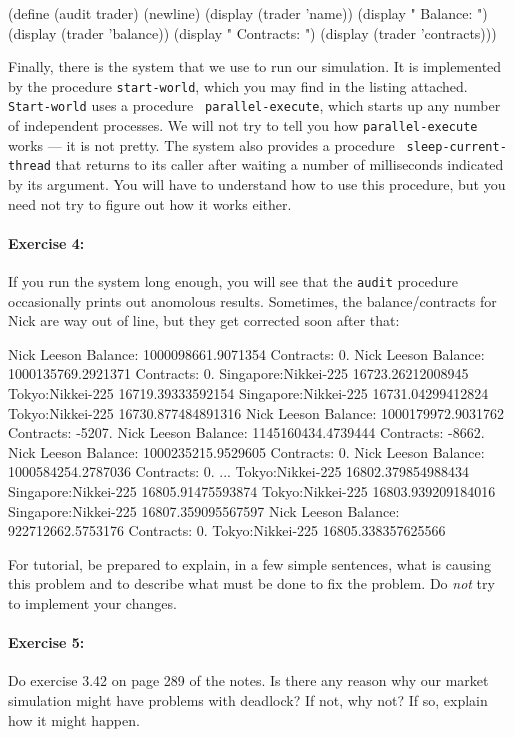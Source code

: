 \beginlisp
(define (audit trader)
  (newline)
  (display (trader 'name))
  (display "    Balance: ")
  (display (trader 'balance))
  (display "    Contracts: ")
  (display (trader 'contracts)))
\endlisp

Finally, there is the system that we use to run our simulation.
It is implemented by the procedure {\tt start-world}, which you may
find in the listing attached.  {\tt Start-world} uses a procedure {\tt
parallel-execute}, which starts up any number of independent
processes.  We will not try to tell you how {\tt parallel-execute}
works --- it is not pretty.  The system also provides a procedure {\tt
sleep-current-thread} that returns to its caller after waiting a
number of milliseconds indicated by its argument.  You will have to
understand how to use this procedure, but you need not try to figure
out how it works either.

\paragraph{Exercise 4:} If you run the system long enough, you will
see that the {\tt audit} procedure occasionally prints out anomolous
results.  Sometimes, the balance/contracts for Nick are way out of
line, but they get corrected soon after that:

\beginlisp
Nick Leeson	Balance: 1000098661.9071354	Contracts: 0.
Nick Leeson	Balance: 1000135769.2921371	Contracts: 0.
Singapore:Nikkei-225		16723.26212008945
Tokyo:Nikkei-225		16719.39333592154
Singapore:Nikkei-225		16731.04299412824
Tokyo:Nikkei-225		16730.877484891316
Nick Leeson	Balance: 1000179972.9031762	Contracts: -5207.
Nick Leeson	Balance: 1145160434.4739444	Contracts: -8662.
Nick Leeson	Balance: 1000235215.9529605	Contracts: 0.
Nick Leeson	Balance: 1000584254.2787036	Contracts: 0.
...
Tokyo:Nikkei-225		16802.379854988434
Singapore:Nikkei-225		16805.91475593874
Tokyo:Nikkei-225		16803.939209184016
Singapore:Nikkei-225		16807.359095567597
Nick Leeson	Balance: 922712662.5753176	Contracts: 0.
Tokyo:Nikkei-225		16805.338357625566
\endlisp

For tutorial, be prepared to explain, in a few simple sentences, what
is causing this problem and to describe what must be done to fix the
problem.  Do {\em not} try to implement your changes.

\paragraph{Exercise 5:}  Do exercise 3.42 on page 289 of the notes.
Is there any reason why our market simulation might have problems with
deadlock?  If not, why not?  If so, explain how it might happen.


